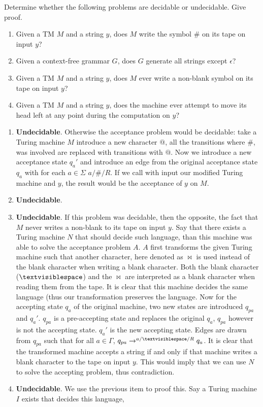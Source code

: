 \documentclass{article}
\begin{document}
\begin{exercise}
Determine whether the following problems are decidable or undecidable. Give proof.
\begin{enumerate}
 \item Given a TM $M$ and a string $y$, does $M$ write the symbol $\#$ on its tape on input $y$?
 \item Given a context-free grammar $G$, does $G$ generate all strings except $\epsilon$?
 \item Given a TM $M$ and a string $y$, does $M$ ever write a non-blank symbol on its tape on input $y$?
 \item Given a TM $M$ and a string $y$, does the machine ever attempt to move its head left at any point during the computation on $y$?
\end{enumerate}
\begin{answer}
\begin{enumerate}
 \item \textbf{Undecidable}. Otherwise the acceptance problem would be decidable: take a Turing machine $M$ introduce a new character $@$, all the transitions where $\#$, was involved are replaced with transitions with $@$. Now we introduce a new acceptance state $q_a'$ and introduce an edge from the original acceptance state $q_a$ with for each $a\in\Sigma$ $a/\#/R$. If we call with input our modified Turing machine and $y$, the result would be the acceptance of $y$ on $M$.
 \item \textbf{Undecidable}.
 \item \textbf{Undecidable}. If this problem was decidable, then the opposite, the fact that $M$ never writes a non-blank to its tape on input $y$. Say that there exists a Turing machine $N$ that should decide such language, than this machine was able to solve the acceptance problem $A$. $A$ first transforms the given Turing machine such that another character, here denoted as $\bowtie$ is used instead of the blank character when writing a blank character. Both the blank character ($\textvisiblespace$) and the $\bowtie$ are interpreted as a blank character when reading them from the tape. It is clear that this machine decides the same language (thus our transformation preserves the language. Now for the accepting state $q_a$ of the original machine, two new states are introduced $q_{pa}$ and $q_a'$. $q_{pa}$ is a pre-accepting state and replaces the original $q_a$, $q_{pa}$ however is not the accepting state. $q_a'$ is the new accepting state. Edges are drawn from $q_{pa}$ such that for all $a\in\Gamma$, $q_{pa}\rightarrow^{a/\textvisiblespace/R}q_a$. It is clear that the transformed machine accepts a string if and only if that machine writes a blank character to the tape on input $y$. This would imply that we can use $N$ to solve the accepting problem, thus contradiction.
 \item \textbf{Undecidable}. We use the previous item to proof this. Say a Turing machine $I$ exists that decides this language, 
\end{enumerate}
\end{answer}
\end{exercise}
\end{document}
